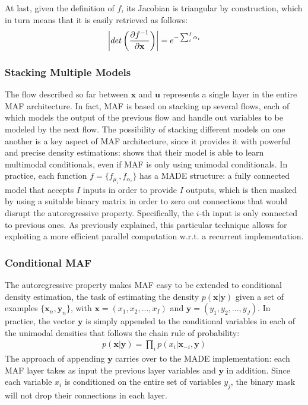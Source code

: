             \\\\
            At last, given the definition of $f$, its Jacobian is triangular by construction, which in turn means that it is easily retrieved as follows:
            \begin{align}
                \abs*{ det \left( \frac{\partial f^{-1}}{\partial \mathbf{x}} \right) } = e^{-\sum_{i}^{I} \alpha_i}
            \end{align}
            
            \subsubsection{Stacking Multiple Models}
                The flow described so far between $\mathbf{x}$ and $\mathbf{u}$ represents a single layer in the entire MAF architecture. In fact, MAF is based on stacking up several flows, each of which models the output of the previous flow and handle out variables to be modeled by the next flow. The possibility of stacking different models on one another is a key aspect of MAF architecture, since it provides it with powerful and precise density estimations:  shows that their model is able to learn multimodal conditionals, even if MAF is only using unimodal conditionals. \newline
                In practice, each function $f = \{ f_{\mu_i}, f_{\alpha_i} \}$ has a MADE structure: a fully connected model that accepts $I$ inputs in order to provide $I$ outputs, which is then masked by using a suitable binary matrix in order to zero out connections that would disrupt the autoregressive property. Specifically, the $i$-th input is only connected to previous ones. As previously explained, this particular technique allows for exploiting a more efficient parallel computation w.r.t. a recurrent implementation.
                
            \subsubsection{Conditional MAF}
                The autoregressive property makes MAF easy to be extended to conditional density estimation, the task of estimating the density $p(\mathbf{x}\vert\mathbf{y})$ given a set of examples $\{ \mathbf{x}_n, \mathbf{y}_n\}$, with $\mathbf{x} = (x_1, x_2, ..., x_I)$ and $\mathbf{y} = (y_1, y_2, ..., y_J)$. In practice, the vector $\mathbf{y}$ is simply appended to the conditional variables in each of the unimodal densities that follows the chain rule of probability:
                \begin{align}
                    p(\mathbf{x}\vert\mathbf{y}) = \prod_{i} p(x_i \vert \mathbf{x}_{-i}, \mathbf{y})
                \end{align}
                The approach of appending $\mathbf{y}$ carries over to the MADE implementation: each MAF layer takes as input the previous layer variables and $\mathbf{y}$ in addition. Since each variable $x_i$ is conditioned on the entire set of variables $y_j$, the binary mask will not drop their connections in each layer.
    
    